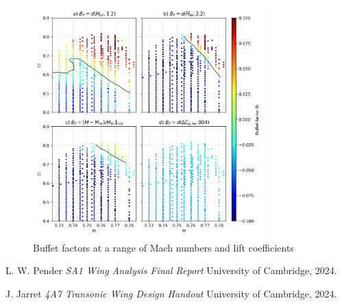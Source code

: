 \documentclass{article}
\begin{document}
\begin{figure}[H]
    \centering
    \includegraphics[width=0.8\textwidth]{figures/buffet_classification.png}
    \caption{Buffet factors at a range of Mach numbers and lift coefficients}
    \label{fig:buffet_classification}
\end{figure}

\begin{thebibliography}{9}


      L. W. Pender
      \emph{SA1 Wing Analysis Final Report}
      University of Cambridge,
      2024.
    
      J. Jarret
      \emph{4A7 Transonic Wing Design Handout}
      University of Cambridge,
      2024.
    
\end{thebibliography}
\end{document}
